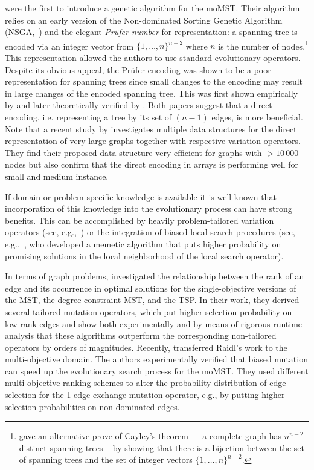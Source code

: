 \documentclass[twoside]{article}
\begin{document}
\citet{ZG99} were the first to introduce a genetic algorithm for the moMST. Their algorithm relies on an early version of the Non-dominated Sorting Genetic Algorithm (NSGA,~\citet{SD94}) and the elegant \emph{Pr\"ufer-number} for representation: a spanning tree is encoded via an integer vector from $\{1, \ldots, n\}^{n-2}$ where $n$ is the number of nodes.\footnote{\citet{Pruefer1918} gave an alternative prove of Cayley's theorem~\citep{Cayley1889} -- a complete graph has $n^{n-2}$ distinct spanning trees -- by showing that there is a bijection between the set of spanning trees and the set of integer vectors $\{1, \ldots, n\}^{n-2}$.} This representation allowed the authors to use standard evolutionary operators. Despite its obvious appeal, the Pr\"ufer-encoding was shown to be a poor representation for spanning trees since small changes to the encoding may result in large changes of the encoded spanning tree. This was first shown empirically by \citet{KC01} and later theoretically verified by \citet{Gottlieb2001}. Both papers suggest that a direct encoding, i.e. representing a tree by its set of $(n-1)$ edges, is more beneficial. Note that a recent study by \cite{barbosa2020DataStructuresForDirectSpanningTree} investigates multiple data structures for the direct representation of very large graphs together with respective variation operators. They find their proposed data structure very efficient for graphs with $> 10\,000$ nodes but also confirm that the direct encoding in arrays is performing well for small and medium instance.

If domain or problem-specific knowledge is available it is well-known that incorporation of this knowledge into the evolutionary process can have strong benefits. This can be accomplished by heavily problem-tailored variation operators (see, e.g.,~\citet{LTHGH08}) or the integration of biased local-search procedures (see, e.g.,~\citet{Ishibuchi2009}, who developed a memetic algorithm that puts higher probability on promising solutions in the local neighborhood of the local search operator).

In terms of graph problems, \citet{RKJ2006_BiasedMutationOperators} investigated the relationship between the rank of an edge and its occurrence in optimal solutions for the single-objective versions of the MST, the degree-constraint MST, and the TSP. In their work, they derived several tailored mutation operators, which put higher selection probability on low-rank edges and show both experimentally and by means of rigorous runtime analysis that these algorithms outperform the corresponding non-tailored operators by orders of magnitudes. Recently, \citet{BNG2019} transferred Raidl's work to the multi-objective domain. The authors experimentally verified that biased mutation can speed up the evolutionary search process for the moMST. They used different multi-objective ranking schemes to alter the probability distribution of edge selection for the 1-edge-exchange mutation operator, e.g., by putting higher selection probabilities on non-dominated edges. 
\end{document}
